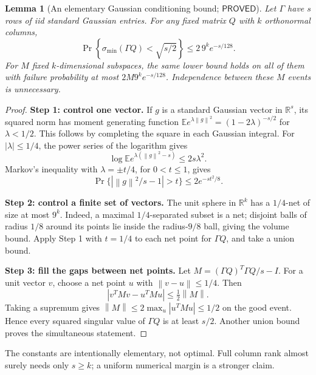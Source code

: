 \documentclass[12pt,a4paper]{article}
\theoremstyle{readable}
\newtheorem{lemma}[theorem]{Lemma}
\theoremstyle{definition}\newtheorem{example}[theorem]{Example}
\newcommand{\R}{\mathbb R}\newcommand{\rank}{\operatorname{rank}}
\newcommand{\norm}[1]{\left\|#1\right\|}
\newcommand{\PP}{\mathsf{PROVED}}\newcommand{\FF}{\mathsf{FALSE}}
\begin{document}
\begin{lemma}[An elementary Gaussian conditioning bound; \(\PP\)]\label{lem:net}
Let \(\Gamma\) have \(s\) rows of iid standard Gaussian entries. For any fixed matrix \(Q\) with \(k\) orthonormal columns,
\[
\Pr\left\{\sigma_{\min}(\Gamma Q)<\sqrt{s/2}\right\}
\le 2\,9^k e^{-s/128}.
\]
For \(M\) fixed \(k\)-dimensional subspaces, the same lower bound holds on all of them with failure probability at most \(2M9^ke^{-s/128}\). Independence between these \(M\) events is unnecessary.
\end{lemma}
\begin{proof}
\textbf{Step 1: control one vector.} If \(g\) is a standard Gaussian vector in \(\R^s\), its squared norm has moment generating function
\(\mathbb E e^{\lambda\norm g^2}=(1-2\lambda)^{-s/2}\) for \(\lambda<1/2\). This follows by completing the square in each Gaussian integral. For \(|\lambda|\le1/4\), the power series of the logarithm gives
\[
\log\mathbb E e^{\lambda(\norm g^2-s)}\le2s\lambda^2.
\]
Markov's inequality with \(\lambda=\pm t/4\), for \(0<t\le1\), gives
\[
\Pr\{|\norm g^2/s-1|>t\}\le2e^{-st^2/8}.
\]

\textbf{Step 2: control a finite set of vectors.} The unit sphere in \(\R^k\) has a \(1/4\)-net of size at most \(9^k\). Indeed, a maximal \(1/4\)-separated subset is a net; disjoint balls of radius \(1/8\) around its points lie inside the radius-\(9/8\) ball, giving the volume bound. Apply Step 1 with \(t=1/4\) to each net point for \(\Gamma Q\), and take a union bound.

\textbf{Step 3: fill the gaps between net points.} Let
\(M=(\Gamma Q)^T\Gamma Q/s-I\). For a unit vector \(v\), choose a net point \(u\) with \(\norm{v-u}\le1/4\). Then
\[
|v^TMv-u^TMu|\le\tfrac12\norm M.
\]
Taking a supremum gives \(\norm M\le2\max_u|u^TMu|\le1/2\) on the good event. Hence every squared singular value of \(\Gamma Q\) is at least \(s/2\). Another union bound proves the simultaneous statement.
\end{proof}
The constants are intentionally elementary, not optimal. Full column rank almost surely needs only \(s\ge k\); a uniform numerical margin is a stronger claim.
\end{document}
